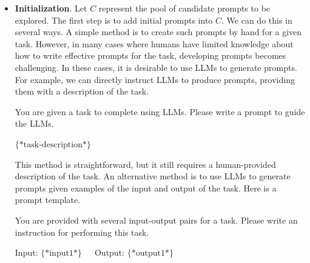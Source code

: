 \begin{itemize}
\item \vspace{0.5em} \textbf{Initialization}. Let $C$ represent the pool of candidate prompts to be explored. The first step is to add initial prompts into $C$.  We can do this in several ways. A simple method is to create such prompts by hand for a given task. However, in many cases where humans have limited knowledge about how to write effective prompts for the task, developing prompts becomes challenging. In these cases, it is desirable to use LLMs to generate prompts. For example, we can directly instruct LLMs to produce prompts, providing them with a description of the task.

\vspace{0.5em}
\begin{tcolorbox}

\begingroup
\setlength{\leftskip}{2em}
\setlength{\rightskip}{2em}

You are given a task to complete using LLMs. Please write a prompt to guide the LLMs.

\vspace{0.5em}

$\{*\mathrm{task\textrm{-}description}*\}$

\vspace{0.5em}

\underline{\hspace{2em}}

\endgroup

\end{tcolorbox}
\vspace{0.5em}

    This method is straightforward, but it still requires a human-provided description of the task. An alternative method is to use LLMs to generate prompts given examples of the input and output of the task. Here is a prompt template.

\vspace{0.5em}
\begin{tcolorbox}

\begingroup
\setlength{\leftskip}{2em}
\setlength{\rightskip}{2em}

You are provided with several input-output pairs for a task. Please write an instruction for performing this task.

\vspace{0.5em}

Input: $\{*\mathrm{input}1*\}$\ \ \ Output: $\{*\mathrm{output}1*\}$


\end{tcolorbox}
\end{itemize}

